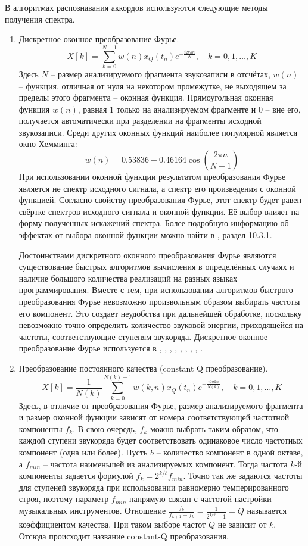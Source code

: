 В алгоритмах распознавания аккордов используются следующие методы получения
спектра.
\begin{enumerate}
  \item Дискретное оконное преобразование Фурье.
  $$X[k] = \sum_{k=0}^{N-1} w(n)x_Q(t_n) e^{-\frac{i 2\pi kn}{N}}, \quad
  k=0, 1, \ldots, K$$
  Здесь $N$ -- размер анализируемого фрагмента звукозаписи в отсчётах, $w(n)$ --
  функция, отличная от нуля на некотором промежутке, не выходящем за пределы
  этого фрагмента -- оконная функция. Прямоугольная оконная функция $w(n)$,
  равная 1 только на анализируемом фрагменте и 0 -- вне его, получается
  автоматически при разделении на фрагменты исходной звукозаписи. Среди других
  оконных функций наиболее популярной является окно Хемминга:
  $$w(n) = 0.53836 - 0.46164 \cos \left( \frac{2\pi n}{N-1} \right)$$
  При использовании оконной функции результатом преобразования Фурье является не
  спектр исходного сигнала, а спектр его произведения с оконной функцией.  
  Согласно свойству преобразования Фурье, этот спектр будет равен свёртке
  спектров исходного сигнала и оконной функции. Её выбор влияет на форму
  полученных искажений спектра. Более подробную информацию об эффектах от выбора
  оконной функции можно найти в \cite{Oppenheim2006}, раздел 10.3.1.
  
  Достоинствами дискретного оконного преобразования Фурье являются существование
  быстрых алгоритмов вычисления в определённых случаях и наличие большого
  количества реализаций на разных языках программирования. Вместе с тем, при
  использовании алгоритмов быстрого преобразования Фурье невозможно произвольным
  образом выбирать частоты его компонент. Это создает неудобства при дальнейшей
  обработке, поскольку невозможно точно определить количество звуковой энергии,
  приходящейся на частоты, соответствующие ступеням звукоряда. Дискретное
  оконное преобразование Фурье используется в \cite{Sheh2003},
  \cite{Gomez2006}, \cite{Burgoyne2007}, \cite{Papadopoulos2007},
  \cite{Khadkevich2009}, \cite{Weller2009}, \cite{Mauch2010},
  \cite{Khadkevich2011}, \cite{DeHaas2012}.
  
  \item Преобразование постоянного качества (constant Q преобразование).
  $$X[k] = \frac{1}{N(k)} \sum_{k=0}^{N(k)-1} w(k,n)x_Q(t_n) e^{-\frac{i 2\pi
  kn}{N(k)}}, \quad k=0, 1, \ldots, K$$ Здесь, в отличие от преобразования
  Фурье, размер анализируемого фрагмента и размер оконной функции зависят от
  номера соответствующей частотной компоненты $f_k$. В свою очередь, $f_k$ можно
  выбрать таким образом, что каждой ступени звукоряда будет соответствовать
  одинаковое число частотных компонент (одна или более). Пусть $b$ -- количество
  компонент в одной октаве, а $f_{min}$ -- частота наименьшей из анализируемых
  компонент. Тогда частота $k$-й компоненты задается формулой $f_k = 2^{k/b}
  f_{min}$. Точно так же задаются частоты для ступеней звукоряда при
  использовании равномерно темперированного строя, поэтому параметр $f_{min}$
  напрямую связан с частотой настройки музыкальных инструментов. Отношение
  $\frac{f_k}{f_{k+1} - f_k} = \frac{1}{2^{1/b}-1} = Q$ называется коэффициентом
  качества. При таком выборе частот $Q$ не зависит от $k$. Отсюда происходит
  название constant-Q преобразования.
  

\end{enumerate}
